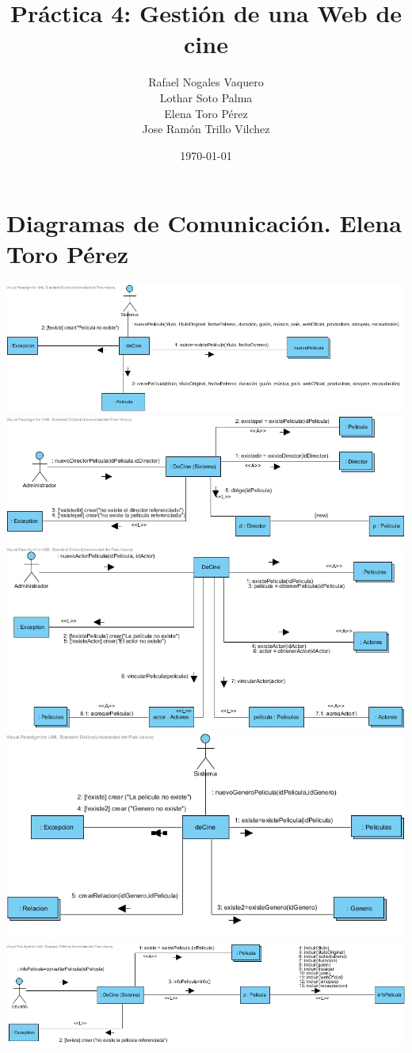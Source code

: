 \documentclass{article}
\title{Práctica 4: Gestión de una Web de cine}
\author{Rafael Nogales Vaquero
\\Lothar Soto Palma
\\Elena Toro Pérez
\\Jose Ramón Trillo Vilchez}
\date{\today}
\begin{document}
\maketitle
\section{Diagramas de Comunicación. Elena Toro Pérez}
\begin{center}
\includegraphics[width=1.3\linewidth]{./E-1}
\includegraphics[width=1.3\linewidth]{./E-2}
\includegraphics[width=1.3\linewidth]{./E-3}
\includegraphics[width=1.3\linewidth]{./E-4}
\includegraphics[width=1.3\linewidth]{./E-5}
\end{center}
\pagebreak
\end{document}
